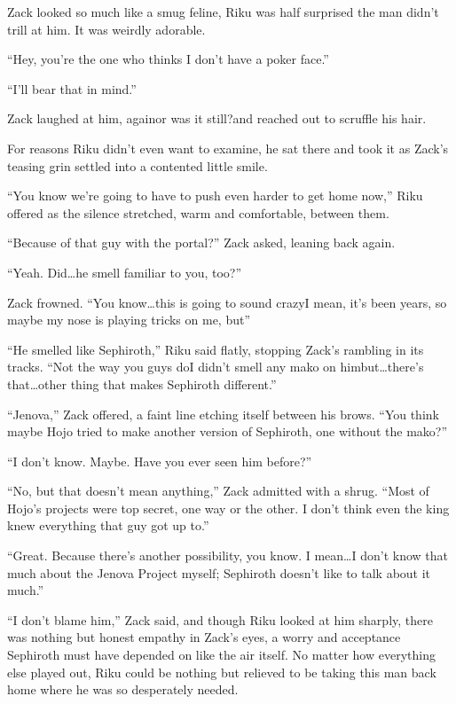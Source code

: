 Zack looked so much like a smug feline, Riku was half surprised the man didn't trill at him. It was weirdly adorable.

``Hey, you're the one who thinks I don't have a poker face.''

``I'll bear that in mind.''

Zack laughed at him, again\textemdash or was it still?\textemdash and reached out to scruffle his hair.

For reasons Riku didn't even want to examine, he sat there and took it as Zack's teasing grin settled into a contented little smile.

``You know we're going to have to push even harder to get home now,'' Riku offered as the silence stretched, warm and comfortable, between them.

``Because of that guy with the portal?'' Zack asked, leaning back again.

``Yeah. Did\ldots he smell familiar to you, too?''

Zack frowned. ``You know\ldots this is going to sound crazy\textemdash I mean, it's been years, so maybe my nose is playing tricks on me, but\textemdash ''

``He smelled like Sephiroth,'' Riku said flatly, stopping Zack's rambling in its tracks. ``Not the way you guys do\textemdash I didn't smell any mako on him\textemdash but\ldots there's that\ldots other thing that makes Sephiroth different.''

``Jenova,'' Zack offered, a faint line etching itself between his brows. ``You think maybe Hojo tried to make another version of Sephiroth, one without the mako?''

``I don't know. Maybe. Have you ever seen him before?''

``No, but that doesn't mean anything,'' Zack admitted with a shrug. ``Most of Hojo's projects were top secret, one way or the other. I don't think even the king knew everything that guy got up to.''

``Great. Because there's another possibility, you know. I mean\ldots I don't know that much about the Jenova Project myself; Sephiroth doesn't like to talk about it much.''

``I don't blame him,'' Zack said, and though Riku looked at him sharply, there was nothing but honest empathy in Zack's eyes, a worry and acceptance Sephiroth must have depended on like the air itself. No matter how everything else played out, Riku could be nothing but relieved to be taking this man back home where he was so desperately needed.

